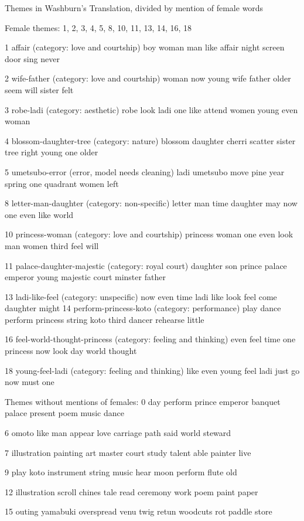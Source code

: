\documentclass[12pt]{article}
\begin{document}
\begin{flushleft}
\begin{spacing}{2.0}
Themes in Washburn’s Translation, divided by mention of female words

Female themes: 
1, 2, 3, 4, 5, 8, 10, 11, 13, 14, 16, 18

1 affair (category: love and courtship)
boy woman man like affair night screen door sing never

2 wife-father (category: love and courtship)
woman now young wife father older seem will sister felt

3 robe-ladi (category: aesthetic)
robe look ladi one like attend women young even woman 

4 blossom-daughter-tree (category: nature)
blossom daughter cherri scatter sister tree right young one older

5 umetsubo-error (error, model needs cleaning)
ladi umetsubo move pine year spring one quadrant women left 

8 letter-man-daughter (category: non-specific)
letter man time daughter may now one even like world 

10 princess-woman (category: love and courtship)
princess woman one even look man women third feel will

11 palace-daughter-majestic (category: royal court)
daughter son prince palace emperor young majestic court minster father

13 ladi-like-feel (category: unspecific) 
now even time ladi like look feel come daughter might
14 perform-princess-koto (category: performance) 
play dance perform princess string koto third dancer rehearse little

16 feel-world-thought-princess (category: feeling and thinking) 
even feel time one princess now look day world thought

18 young-feel-ladi (category: feeling and thinking) 
like even young feel ladi just go now must one 

Themes without mentions of females: 
0 day perform prince emperor banquet palace present poem music dance 

6 omoto like man appear love carriage path said world steward

7 illustration painting art master court study talent able painter live 

9 play koto instrument string music hear moon perform flute old

12 illustration scroll chines tale read ceremony work poem paint paper

15 outing yamabuki overspread venu twig retun woodcuts rot paddle store


\end{spacing}
\end{flushleft}
\end{document}
